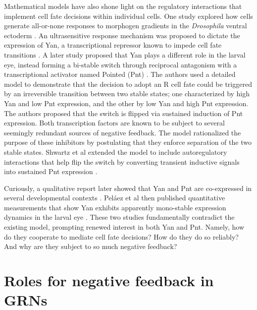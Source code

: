 Mathematical models have also shone light on the regulatory interactions that implement cell fate decisions within individual cells. One study explored how cells generate all-or-none responses to morphogen gradients in the \textit{Drosophila} ventral ectoderm \cite{Melen2005}. An ultrasensitive response mechanism was proposed to dictate the expression of Yan, a transcriptional repressor known to impede cell fate transitions \cite{Lai1992a,Rogge1995,Rebay1995}. A later study proposed that Yan plays a different role in the larval eye, instead forming a bi-stable switch through reciprocal antagonism with a transcriptional activator named Pointed (Pnt) \cite{Graham2010}. The authors used a detailed model to demonstrate that the decision to adopt an R cell fate could be triggered by an irreversible transition between two stable states; one characterized by high Yan and low Pnt expression, and the other by low Yan and high Pnt expression. The authors proposed that the switch is flipped via sustained induction of Pnt expression. Both transcription factors are known to be subject to several seemingly redundant sources of negative feedback. The model rationalized the purpose of these inhibitors by postulating that they enforce separation of the two stable states. Shwartz et al extended the model to include autoregulatory interactions that help flip the switch by converting transient inductive signals into sustained Pnt expression \cite{Shwartz2013}. 

Curiously, a qualitative report later showed that Yan and Pnt are co-expressed in several developmental contexts \cite{BoisclairLachance2014}. Pel\'{a}ez et al then published quantitative measurements that show Yan exhibits apparently mono-stable expression dynamics in the larval eye \cite{Pelaez2015a}. These two studies fundamentally contradict the existing model, prompting renewed interest in both Yan and Pnt. Namely, how do they cooperate to mediate cell fate decisions? How do they do so reliably? And why are they subject to so much negative feedback?

\section{Roles for negative feedback in GRNs}
 
